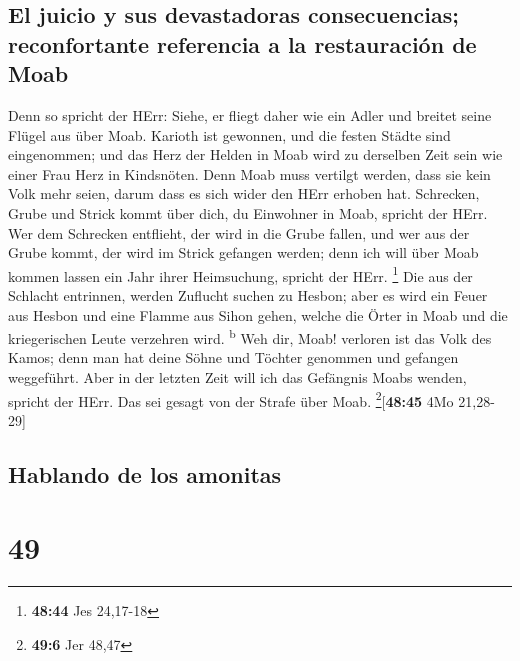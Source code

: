 \hypertarget{el-juicio-y-sus-devastadoras-consecuencias-reconfortante-referencia-a-la-restauraciuxf3n-de-moab}{%
\subsection{El juicio y sus devastadoras consecuencias; reconfortante
referencia a la restauración de
Moab}\label{el-juicio-y-sus-devastadoras-consecuencias-reconfortante-referencia-a-la-restauraciuxf3n-de-moab}}

 Denn so spricht der HErr: Siehe, er fliegt daher wie ein
Adler und breitet seine Flügel aus über Moab.  Karioth
ist gewonnen, und die festen Städte sind eingenommen; und das Herz der
Helden in Moab wird zu derselben Zeit sein wie einer Frau Herz in
Kindsnöten.  Denn Moab muss vertilgt werden, dass sie
kein Volk mehr seien, darum dass es sich wider den HErr erhoben hat.
 Schrecken, Grube und Strick kommt über dich, du
Einwohner in Moab, spricht der HErr.  Wer dem Schrecken
entflieht, der wird in die Grube fallen, und wer aus der Grube kommt,
der wird im Strick gefangen werden; denn ich will über Moab kommen
lassen ein Jahr ihrer Heimsuchung, spricht der HErr. \footnote{\textbf{48:44}
  Jes 24,17-18}  Die aus der Schlacht entrinnen, werden
Zuflucht suchen zu Hesbon; aber es wird ein Feuer aus Hesbon und eine
Flamme aus Sihon gehen, welche die Örter in Moab und die kriegerischen
Leute verzehren wird. \textsuperscript{b}  Weh dir, Moab!
verloren ist das Volk des Kamos; denn man hat deine Söhne und Töchter
genommen und gefangen weggeführt.  Aber in der letzten
Zeit will ich das Gefängnis Moabs wenden, spricht der HErr. Das sei
gesagt von der Strafe über Moab. \footnote{\textbf{49:6} Jer 48,47}{[}\textbf{48:45}
4Mo 21,28-29{]}

\hypertarget{hablando-de-los-amonitas}{%
\subsection{Hablando de los amonitas}\label{hablando-de-los-amonitas}}

\hypertarget{section-48}{%
\section{49}\label{section-48}}

